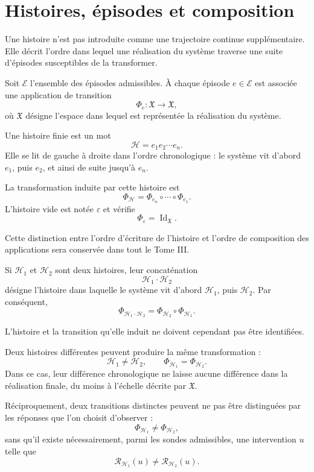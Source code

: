 \section{Histoires, épisodes et composition}
\label{t3-histoires-episodes-composition}

Une histoire n'est pas introduite comme une trajectoire continue supplémentaire. Elle décrit l'ordre dans lequel une réalisation du système traverse une suite d'épisodes susceptibles de la transformer.

Soit $\mathcal E$ l'ensemble des épisodes admissibles. À chaque épisode $e\in\mathcal E$ est associée une application de transition
\[
\Phi_e:\mathfrak X\longrightarrow\mathfrak X,
\]
où $\mathfrak X$ désigne l'espace dans lequel est représentée la réalisation du système.

Une histoire finie est un mot
\[
\mathcal H=e_1e_2\cdots e_n.
\]
Elle se lit de gauche à droite dans l'ordre chronologique : le système vit d'abord $e_1$, puis $e_2$, et ainsi de suite jusqu'à $e_n$.

La transformation induite par cette histoire est
\[
\Phi_{\mathcal H}
=
\Phi_{e_n}\circ\cdots\circ\Phi_{e_1}.
\]
L'histoire vide est notée $\varepsilon$ et vérifie
\[
\Phi_{\varepsilon}
=
\operatorname{Id}_{\mathfrak X}.
\]

Cette distinction entre l'ordre d'écriture de l'histoire et l'ordre de composition des applications sera conservée dans tout le Tome III.

Si $\mathcal H_1$ et $\mathcal H_2$ sont deux histoires, leur concaténation
\[
\mathcal H_1\cdot\mathcal H_2
\]
désigne l'histoire dans laquelle le système vit d'abord $\mathcal H_1$, puis $\mathcal H_2$. Par conséquent,
\begin{equation}
\label{eq:t3-composition-histoires}
\boxed{
\Phi_{\mathcal H_1\cdot\mathcal H_2}
=
\Phi_{\mathcal H_2}\circ\Phi_{\mathcal H_1}.
}
\end{equation}

L'histoire et la transition qu'elle induit ne doivent cependant pas être identifiées.

Deux histoires différentes peuvent produire la même transformation :
\[
\mathcal H_1\neq\mathcal H_2,
\qquad
\Phi_{\mathcal H_1}
=
\Phi_{\mathcal H_2}.
\]
Dans ce cas, leur différence chronologique ne laisse aucune différence dans la réalisation finale, du moins à l'échelle décrite par $\mathfrak X$.

Réciproquement, deux transitions distinctes peuvent ne pas être distinguées par les réponses que l'on choisit d'observer :
\[
\Phi_{\mathcal H_1}
\neq
\Phi_{\mathcal H_2},
\]
sans qu'il existe nécessairement, parmi les sondes admissibles, une intervention $u$ telle que
\[
\mathcal R_{\mathcal H_1}(u)
\neq
\mathcal R_{\mathcal H_2}(u).
\]

